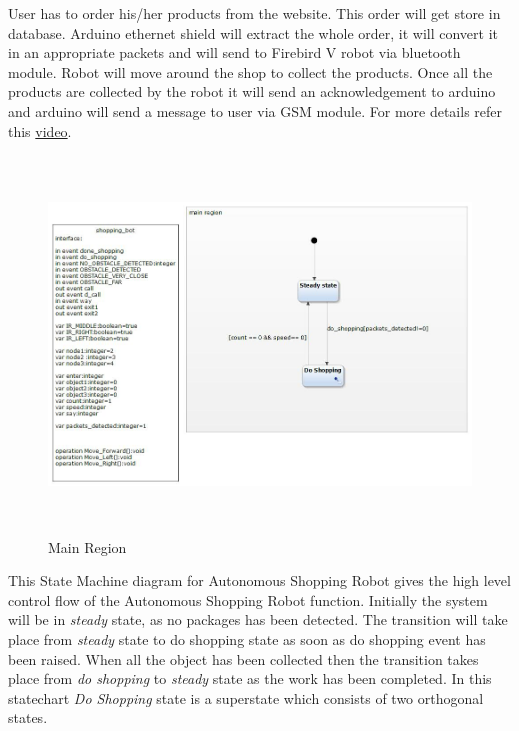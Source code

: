 \documentclass[a4paper,12pt,oneside]{article}
\begin{document}
User has to order his/her products from the website. This order will get store in database. Arduino ethernet shield will extract the whole order, it will convert it in an appropriate packets and will send to Firebird V robot via bluetooth module. Robot will move around the shop to collect the products. Once all the products are collected by the robot it will send an acknowledgement to arduino and arduino will send a message to user via GSM module. For more details refer this \href{https://youtu.be/47TJFqiCook}{video}. 
\begin{figure}[H]
\centering
\includegraphics[width=16cm,height=10cm]{7.jpg}
\caption{Main Region}
\end{figure}
This State Machine diagram for Autonomous Shopping Robot gives the high level control flow of the Autonomous Shopping Robot function. Initially the system will be in \emph{steady} state, as no packages has been detected. The transition will take place from \emph{steady} state to do shopping state as soon as do shopping event has been raised. When  all the object has been collected then the transition takes place from \emph{do shopping} to \emph{steady} state as the work has been completed. In this statechart \emph{Do Shopping} state is a superstate which consists of two orthogonal states.\\
\end{document}
